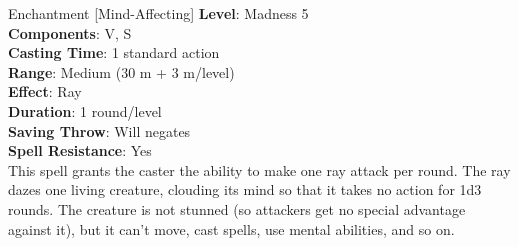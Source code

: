 {Enchantment [Mind-Affecting]}
{
	\textbf{Level}: Madness 5\\
	\textbf{Components}: V, S\\
	\textbf{Casting Time}: 1 standard action\\
	\textbf{Range}: Medium (30 m + 3 m/level)\\
	\textbf{Effect}: Ray\\
	\textbf{Duration}: 1 round/level\\
	\textbf{Saving Throw}: Will negates\\
	\textbf{Spell Resistance}: Yes\\
}
{
	This spell grants the caster the ability to make one ray attack per round. The ray dazes one living creature, clouding its mind so that it takes no action for 1d3 rounds. The creature is not stunned (so attackers get no special advantage against it), but it can’t move, cast spells, use mental abilities, and so on.
}